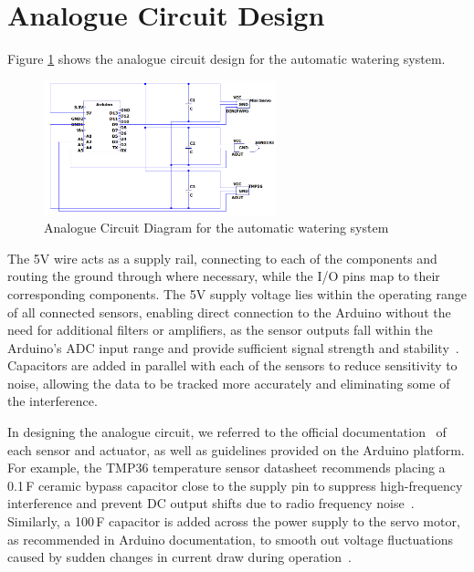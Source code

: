 \documentclass[a4paper,11pt]{article}
\begin{document}
\section{Analogue Circuit Design}
\label{sec:Analogue_Circuit_Design}

Figure \ref{fig:Analogue_Circuit_Diagram_for_the_automatic_watering_system}
shows the analogue circuit design for the automatic watering system.

\begin{figure}[H]
    \centering
    \includegraphics[width=0.6\textwidth]{Analogue Circuit Diagram.png}
    \caption{Analogue Circuit Diagram for the automatic watering system}
    \label{fig:Analogue_Circuit_Diagram_for_the_automatic_watering_system}
\end{figure}

The 5V wire acts as a supply rail, connecting to each of the components and routing the ground through where necessary, while the I/O pins map to their corresponding components. 
The 5V supply voltage lies within the operating range of all connected sensors, enabling direct connection to the Arduino without the need for additional filters or amplifiers, 
as the sensor outputs fall within the Arduino’s ADC input range and provide sufficient signal strength and stability~\cite{arduino_servo}.
Capacitors are added in parallel with each of the sensors to reduce sensitivity to noise, allowing the data to be tracked more accurately and eliminating some of the interference.

In designing the analogue circuit, we referred to the official documentation~\cite{arduino_servo,tmp36,dfrobot} of each sensor and actuator, as well as guidelines provided on the Arduino platform. 
For example, the TMP36 temperature sensor datasheet recommends placing a 0.1\,\textmu F ceramic bypass capacitor close to the supply pin to suppress high-frequency interference and prevent DC output shifts due to radio frequency noise~\cite{tmp36}. 
Similarly, a 100\,\textmu F capacitor is added across the power supply to the servo motor, as recommended in Arduino documentation, to smooth out voltage fluctuations caused by sudden changes in current draw during operation~\cite{arduino_servo}.
\end{document}
